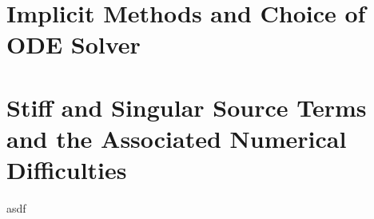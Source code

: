 \documentclass{beamer}
\begin{document}
\section{Implicit Methods and Choice of ODE Solver}















\section{Stiff and Singular Source Terms and the Associated Numerical Difficulties}
asdf



































\end{document}

